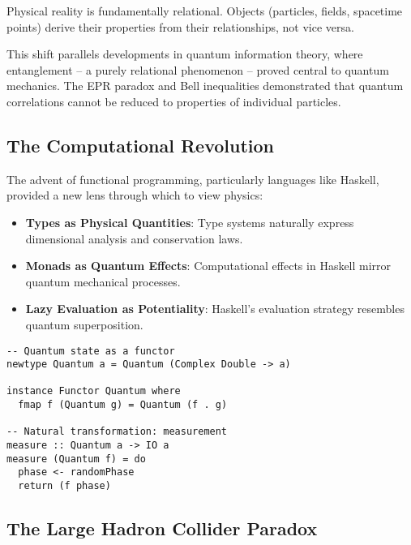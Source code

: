 \begin{definition}
Physical reality is fundamentally relational. Objects (particles, fields, spacetime points) derive their properties from their relationships, not vice versa.
\end{definition}

This shift parallels developments in quantum information theory, where entanglement -- a purely relational phenomenon -- proved central to quantum mechanics. The EPR paradox and Bell inequalities demonstrated that quantum correlations cannot be reduced to properties of individual particles.

\subsection{The Computational Revolution}

The advent of functional programming, particularly languages like Haskell, provided a new lens through which to view physics:

\begin{itemize}[leftmargin=*]
\item \textbf{Types as Physical Quantities}: Type systems naturally express dimensional analysis and conservation laws.
\item \textbf{Monads as Quantum Effects}: Computational effects in Haskell mirror quantum mechanical processes.
\item \textbf{Lazy Evaluation as Potentiality}: Haskell's evaluation strategy resembles quantum superposition.
\end{itemize}

\begin{example}
\begin{verbatim}
-- Quantum state as a functor
newtype Quantum a = Quantum (Complex Double -> a)

instance Functor Quantum where
  fmap f (Quantum g) = Quantum (f . g)

-- Natural transformation: measurement
measure :: Quantum a -> IO a
measure (Quantum f) = do
  phase <- randomPhase
  return (f phase)
\end{verbatim}
\end{example}

\subsection{The Large Hadron Collider Paradox}

